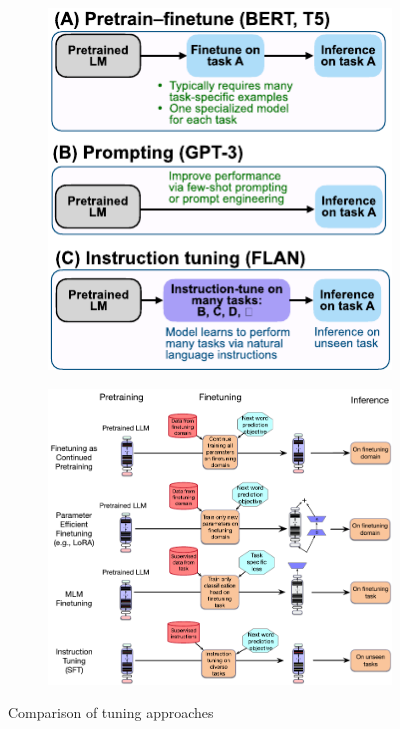 \begin{description}
        \begin{figure}[H]
            \centering
            \begin{subfigure}[c]{0.34\linewidth}
                \centering
                \includegraphics[width=\linewidth]{./img/_tuning_comparison1.pdf}
            \end{subfigure}
            \hfill
            \begin{subfigure}[c]{0.6\linewidth}
                \centering
                \includegraphics[width=\linewidth]{./img/_tuning_comparison2.pdf}
            \end{subfigure}
            \caption{Comparison of tuning approaches}
        \end{figure}
\end{description}


